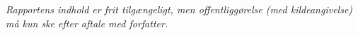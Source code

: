 \vfill

{\footnotesize\itshape Rapportens indhold er frit tilgængeligt, men offentliggørelse (med kildeangivelse) må kun ske efter aftale med forfatter.}


